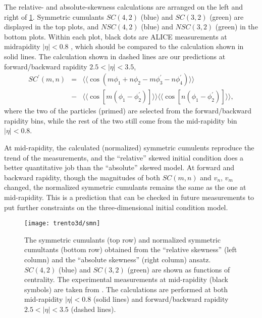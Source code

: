 The relative- and absolute-skewness calculations are arranged on the left and right of \ref{fig:trento:smn}. 
Symmetric cumulants $SC(4,2)$ (blue) and $SC(3,2)$ (green) are displayed in the top plots, and $NSC(4,2)$ (blue) and $NSC(3,2)$ (green) in the bottom plots.
Within each plot, black dots are ALICE measurements at midrapidity $|\eta|<0.8$ \cite{ALICE:2016kpq}, which should be compared to the calculation shown in solid lines.
The calculation shown in dashed lines are our predictions at forward/backward rapidity $2.5 < |\eta| < 3.5$,
\begin{eqnarray}
SC^\prime(m, n) &=& \langle\langle \cos(m\phi_1+n\phi_2-m\phi_3^\prime-n\phi_4^\prime)\rangle\rangle \\
\nonumber &-& \langle\langle\cos[m(\phi_1-\phi_2^\prime)]\rangle\rangle\langle\langle\cos[n(\phi_1-\phi_2^\prime)]\rangle\rangle, \label{eq:scmn}
\end{eqnarray}
where the two of the particles (primed) are selected from the forward/backward rapidity bins, while the rest of the two still come from the mid-rapidity bin $|\eta|<0.8$.

At mid-rapidity, the calculated (normalized) symmetric cumulents reproduce the trend of the measurements, and the ``relative'' skewed initial condition does a better quantitative job than the ``absolute'' skewed model.
At forward and backward rapidity, though the magnitudes of both $SC(m,n)$ and $v_n$, $v_m$ changed, the normalized symmetric cumulants remains the same as the one at mid-rapidity.
This is a prediction that can be checked in future measurements to put further constraints on the three-dimensional initial condition model.

\begin{figure}
\texttt{[image: trento3d/smn]}
\caption{The symmetric cumulants (top row) and normalized symmetric cumultants (bottom row) obtained from the ``relative skewness'' (left column) and the ``absolute skewness'' (right column) ansatz.
$SC(4,2)$ (blue) and $SC(3,2)$ (green) are shown as functions of centrality. The experimental measurements at mid-rapidity (black symbols) are taken from \cite{ALICE:2016kpq}.
The calculations are performed at both mid-rapidity $|\eta|<0.8$ (solid lines) and forward/backward rapidity $2.5<|\eta|<3.5$ (dashed lines).
}
\label{fig:trento:smn} 
\end{figure}

